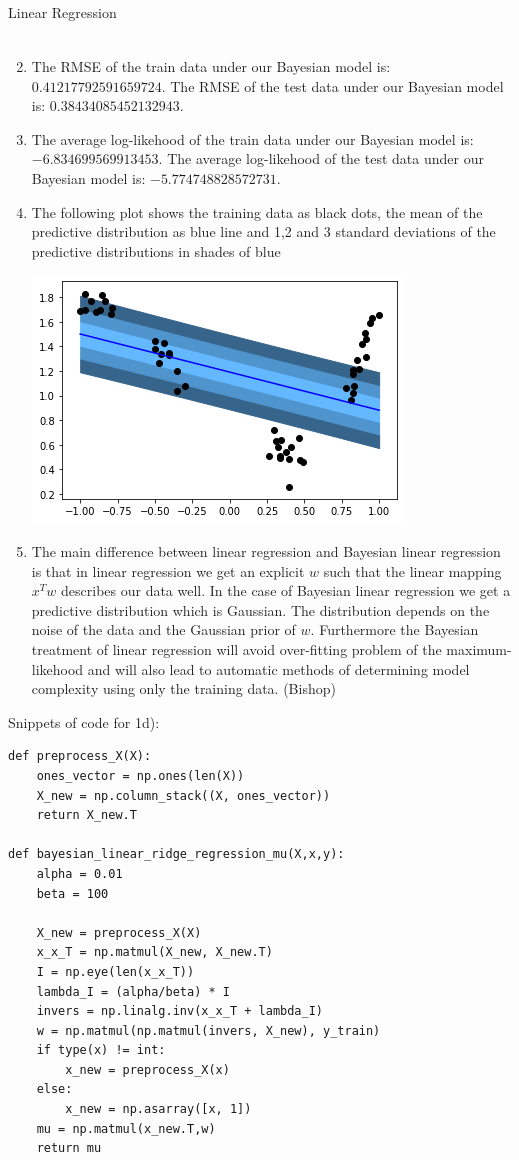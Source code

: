 \begin{task}{Linear Regression}
\begin{subtask}
\begin{enumerate}
\begin{align*}
\end{align*}
\item The RMSE of the train data under our Bayesian model is: $0.41217792591659724$. The RMSE of the test data under our Bayesian model is: $0.38434085452132943$. 
\item The average log-likehood of the train data under our Bayesian model is: $-6.834699569913453$. The average log-likehood of the test data under our Bayesian model is: $-5.774748828572731$.
\item The following plot shows the training data as black dots, the mean of the predictive distribution as blue line and 1,2 and 3 standard deviations of the predictive distributions in shades of blue
\begin{center}
\includegraphics{Figure_1d.png}
\end{center}
\item The main difference between linear regression and Bayesian linear regression is that in linear regression we get an explicit $w$ such that the linear mapping $x^Tw$ describes our data well. In the case of Bayesian linear regression we get a predictive distribution which is Gaussian. The distribution depends on the noise of the data and the Gaussian prior of $w$. Furthermore the Bayesian treatment of linear regression will avoid over-fitting problem of the maximum-likehood and will also lead to automatic methods of determining model complexity using only the training data. (Bishop)
\end{enumerate}
Snippets of code for 1d):
\begin{lstlisting}
def preprocess_X(X):
    ones_vector = np.ones(len(X))
    X_new = np.column_stack((X, ones_vector))
    return X_new.T
    
def bayesian_linear_ridge_regression_mu(X,x,y):
    alpha = 0.01
    beta = 100
    
    X_new = preprocess_X(X)
    x_x_T = np.matmul(X_new, X_new.T)
    I = np.eye(len(x_x_T))
    lambda_I = (alpha/beta) * I
    invers = np.linalg.inv(x_x_T + lambda_I)
    w = np.matmul(np.matmul(invers, X_new), y_train)
    if type(x) != int:
        x_new = preprocess_X(x)
    else:
        x_new = np.asarray([x, 1])
    mu = np.matmul(x_new.T,w)
    return mu


\end{lstlisting}
\end{subtask}
\end{task}
